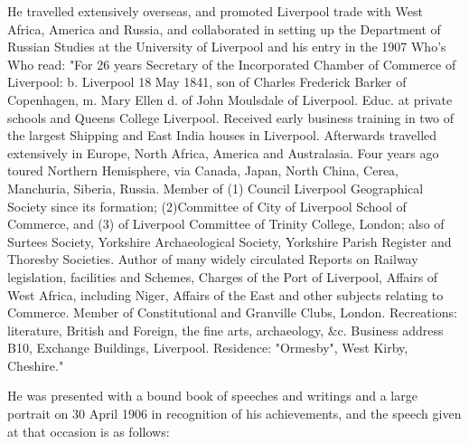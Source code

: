 He travelled extensively overseas, and promoted Liverpool trade with West Africa, America and Russia, and collaborated in setting up the Department of Russian Studies at the University of Liverpool and his entry in  the 1907 Who's Who read:
  "For 26 years Secretary of the Incorporated Chamber of Commerce of Liverpool: b. Liverpool 18 May 1841, son of Charles Frederick Barker of Copenhagen, m. Mary Ellen d. of John Moulsdale of Liverpool. Educ. at private schools and Queens College Liverpool. Received early business training in two of the largest Shipping and East India houses in Liverpool. Afterwards travelled extensively in Europe, North Africa, America and Australasia. Four years ago toured Northern Hemisphere, via Canada, Japan, North China, Cerea, Manchuria, Siberia, Russia. Member of (1) Council Liverpool Geographical Society since its formation; (2)Committee of City of Liverpool School of Commerce, and (3) of Liverpool Committee of Trinity College, London; also of Surtees Society, Yorkshire Archaeological Society, Yorkshire Parish Register and Thoresby Societies. Author of many widely circulated Reports on Railway legislation, facilities and Schemes, Charges of the Port of Liverpool, Affairs of West Africa, including Niger, Affairs of the East and other subjects relating to Commerce. Member of Constitutional and Granville Clubs, London. Recreations: literature, British and Foreign, the fine arts, archaeology, &c. Business address B10, Exchange Buildings, Liverpool. Residence: "Ormesby", West Kirby, Cheshire."

 He was presented with a bound book of speeches and writings and a large portrait on 30 April 1906 in recognition of his achievements,  and the speech given at that occasion is as follows:


